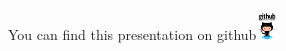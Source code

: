 \documentclass[newPxFont]{beamer}
\begin{document}
{
%
\begin{frame}
  \vspace{-1em}
  \begin{minipage}[t][.8\textheight]{\textwidth}

    \vfill
  \end{minipage}
  \vspace{-3.5em}
  \centering
	You can find this presentation on github\includegraphics[height=0.85cm]{img/github}

\end{frame}
}
\end{document}
